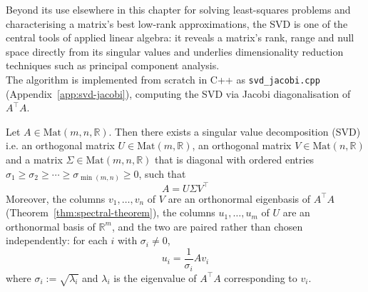 	Beyond its use elsewhere in this chapter for solving least-squares problems and characterising a matrix's best low-rank approximations, the SVD is one of the central tools of applied linear algebra: it reveals a matrix's rank, range and null space directly from its singular values and underlies dimensionality reduction techniques such as principal component analysis. \\
	
	The algorithm is implemented from scratch in C++ as \texttt{svd\_jacobi.cpp} (Appendix~\ref{app:svd-jacobi}), computing the SVD via Jacobi diagonalisation of $A^\top A$.
	
	\begin{theorem}
		\label{thm:svd}
		Let $A \in \mathrm{Mat}(m, n, \mathbb{R})$. Then there exists a singular value decomposition (SVD) i.e. an orthogonal matrix $U \in \mathrm{Mat}(m,\mathbb{R})$, an orthogonal matrix $V \in \mathrm{Mat}(n,\mathbb{R})$ and a matrix $\Sigma \in \mathrm{Mat}(m,n,\mathbb{R})$ that is diagonal with ordered entries $\sigma_1 \ge \sigma_2 \ge \cdots \ge \sigma_{\min(m,n)} \ge 0$, such that
		\[
			A = U\Sigma V^\top
		\]
		Moreover, the columns $v_1,\dots,v_n$ of $V$ are an orthonormal eigenbasis of $A^\top A$ (Theorem~\ref{thm:spectral-theorem}), the columns $u_1,\dots,u_m$ of $U$ are an orthonormal basis of $\mathbb{R}^m$, and the two are paired rather than chosen independently: for each $i$ with $\sigma_i \neq 0$,
		\[
			u_i = \frac{1}{\sigma_i} Av_i
		\]
		where $\sigma_i := \sqrt{\lambda_i}$ and $\lambda_i$ is the eigenvalue of $A^\top A$ corresponding to $v_i$.
	\end{theorem}
	
